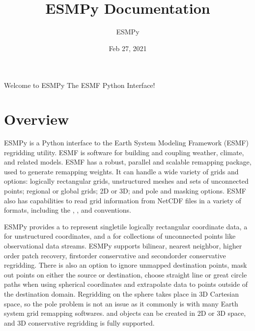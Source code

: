 \documentclass[letterpaper,10pt,english]{sphinxmanual}
\title{ESMPy Documentation}
\date{Feb 27, 2021}
\author{ESMPy}
\begin{document}
\pagestyle{empty}
\sphinxmaketitle
\pagestyle{plain}
\sphinxtableofcontents
\pagestyle{normal}
\label{\detokenize{index::doc}}


Welcome to ESMPy \sphinxhyphen{} The ESMF Python Interface!


\chapter{Overview}
\label{\detokenize{intro:module-ESMF}}\label{\detokenize{intro:overview}}\label{\detokenize{intro::doc}}
ESMPy is a Python interface to the Earth System Modeling Framework (ESMF) 
regridding utility. ESMF is software for
building and coupling weather, climate, and related models. ESMF has a robust,
parallel and scalable remapping package, used to generate remapping weights.
It can handle a wide variety of grids and options: logically rectangular grids,
unstructured meshes and sets of unconnected points; regional or global grids;
2D or 3D; and pole and masking options. ESMF also has capabilities to read grid
information from NetCDF files in a variety of formats, including the
,
,
and
conventions.

ESMPy provides a {\hyperref[\detokenize{grid:ESMF.api.grid.Grid}]{}} to represent single\sphinxhyphen{}tile logically
rectangular coordinate data, a {\hyperref[\detokenize{mesh:ESMF.api.mesh.Mesh}]{}} for unstructured 
coordinates, and a {\hyperref[\detokenize{locstream:ESMF.api.locstream.LocStream}]{}} for collections of
unconnected points like observational data streams.
ESMPy supports bilinear, nearest neighbor, higher order patch recovery, 
first\sphinxhyphen{}order conservative and second\sphinxhyphen{}order conservative regridding. There is 
also an option to ignore unmapped destination points, mask out points on either
the source or destination, choose straight line or great circle paths when using
spherical coordinates and extrapolate data to points outside of the destination
domain. Regridding on the sphere takes place in 3D Cartesian space, so the pole
problem is not an issue as it commonly is with many Earth system grid remapping
softwares. {\hyperref[\detokenize{grid:ESMF.api.grid.Grid}]{}} and {\hyperref[\detokenize{mesh:ESMF.api.mesh.Mesh}]{}} 
objects can be created in 2D or 3D space, and 3D conservative regridding is 
fully supported.
\end{document}
